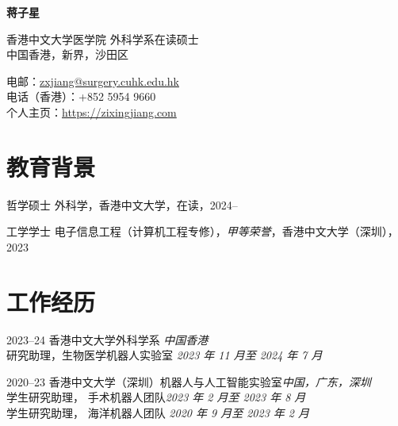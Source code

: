 \documentclass[utf8, 11pt,letterpaper]{report}
\newcommand{\myname}{蒋子星}
\newcommand{\namefont}[1]{{\normalfont\bfseries\Huge{#1}}}
\begin{document}
	\thispagestyle{firstpagefooter}
	\raggedright{}
	
\namefont{\myname}
	
\vspace{1em}
\begin{minipage}[t]{0.600\textwidth}
	香港中文大学医学院
	外科学系在读硕士\\
	中国香港，新界，沙田区
\end{minipage}
\hfil
\begin{minipage}[t]{0.395\textwidth}
	\flushright{}
	电邮：\href{mailto:zxjiang@surgery.cuhk.edu.hk}{zxjiang@surgery.cuhk.edu.hk} \\
	电话（香港）：+852 5954 9660 \\
	个人主页：\href{https://zixingjiang.com}{https://zixingjiang.com}\\
\end{minipage}
	
\section*{教育背景}
\begin{tablist}
	\item[哲学硕士]  \tab{}外科学，香港中文大学，在读，2024--\\
	\item[工学学士]  \tab{}电子信息工程（计算机工程专修），\textit{甲等荣誉}，香港中文大学（深圳），2023\\
\end{tablist}
	

\section*{工作经历}
	
\begin{tablist}
	\item[2023--24]   \tab{}香港中文大学外科学系 \hfill \textit{中国香港}\\
	研究助理，生物医学机器人实验室 \hfill \emph{\emph{2023} 年 \emph{11} 月至 \emph{2024} 年 \emph{7}  月}
		
	\item[2020--23]   \tab{}香港中文大学（深圳）机器人与人工智能实验室\hfill \textit{中国，广东，深圳}\\
	学生研究助理， 手术机器人团队\hfill \emph{\emph{2023} 年 \emph{2} 月至 \emph{2023} 年 \emph{8}  月}\\
学生研究助理， 海洋机器人团队 \hfill \emph{\emph{2020} 年 \emph{9} 月至 \emph{2023} 年 \emph{2}  月}
\end{tablist}
	
\end{document}
